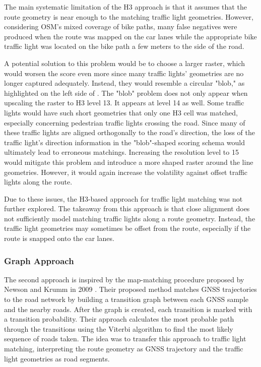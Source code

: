 The main systematic limitation of the H3 approach is that it assumes that the route geometry is near enough to the matching traffic light geometries. However, considering OSM's mixed coverage of bike paths, many false negatives were produced when the route was mapped on the car lanes while the appropriate bike traffic light was located on the bike path a few meters to the side of the road.

A potential solution to this problem would be to choose a larger raster, which would worsen the score even more since many traffic lights' geometries are no longer captured adequately. Instead, they would resemble a circular "blob," as highlighted on the left side of . The "blob" problem does not only appear when upscaling the raster to H3 level 13. It appears at level 14 as well. Some traffic lights would have such short geometries that only one H3 cell was matched, especially concerning pedestrian traffic lights crossing the road. Since many of these traffic lights are aligned orthogonally to the road's direction, the loss of the traffic light's direction information in the "blob"-shaped scoring schema would ultimately lead to erroneous matchings. Increasing the resolution level to 15 would mitigate this problem and introduce a more shaped raster around the line geometries. However, it would again increase the volatility against offset traffic lights along the route.

Due to these issues, the H3-based approach for traffic light matching was not further explored. The takeaway from this approach is that close alignment does not sufficiently model matching traffic lights along a route geometry. Instead, the traffic light geometries may sometimes be offset from the route, especially if the route is snapped onto the car lanes.

\subsubsection{Graph Approach}

The second approach is inspired by the map-matching procedure proposed by Newson and Krumm in 2009 \cite{newson_hidden_2009}. Their proposed method matches GNSS trajectories to the road network by building a transition graph between each GNSS sample and the nearby roads. After the graph is created, each transition is marked with a transition probability. Their approach calculates the most probable path through the transitions using the Viterbi algorithm to find the most likely sequence of roads taken. The idea was to transfer this approach to traffic light matching, interpreting the route geometry as GNSS trajectory and the traffic light geometries as road segments.

